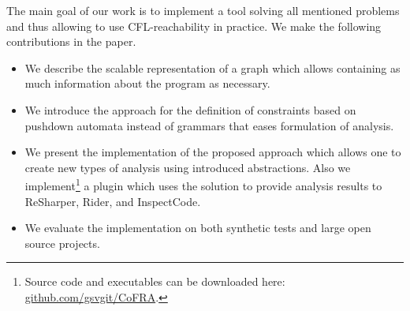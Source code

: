 The main goal of our work is to implement a tool solving all mentioned problems and thus allowing to use CFL-reachability in practice.
We make the following contributions in the paper.
\begin{itemize}
	\item We describe the scalable representation of a graph which allows containing as much information about the program as necessary.
	\item We introduce the approach for the definition of constraints based on pushdown automata instead of grammars that eases formulation of analysis.
	\item We present the implementation of the proposed approach which allows one to create new types of analysis using introduced abstractions.
	Also we implement\footnote{Source code and executables can be downloaded here: \url{github.com/gsvgit/CoFRA}.} a plugin which uses the solution to provide analysis results to ReSharper, Rider, and InspectCode.
	\item We evaluate the implementation on both synthetic tests and large open source projects.
\end{itemize}
